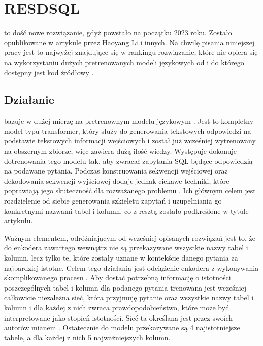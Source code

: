 \section{RESDSQL}
 to dość nowe rozwiązanie, gdyż powstało na początku 2023 roku. Zostało opublikowane w artykule   przez Haoyang Li i innych. Na chwilę pisania niniejszej pracy jest to najwyżej znajdujące się w rankingu  rozwiązanie, które nie opiera się na wykorzystaniu dużych pretrenowanych modeli językowych od  i do którego dostępny jest kod źródłowy .

\subsection{Działanie}
 bazuje w dużej mierzę na pretrenownym modelu językowym  . Jest to kompletny model typu transformer, który służy do generowania tekstowych odpowiedzi na podstawie tekstowych informacji wejściowych i został już wcześniej wytrenowany na obszernym zbiorze, więc zawiera dużą ilość wiedzy. Występuje   dokonuje dotrenowania tego modelu tak, aby zwracał zapytania SQL będące odpowiedzią na podawane pytania. Podczas konstruowania sekwencji wejściowej oraz dekodowania sekwencji wyjściowej dodaje jednak ciekawe techniki, które poprawiają jego skuteczność dla rozważanego problemu . Ich głównym celem jest rozdzielenie od siebie generowania szkieletu zapytań i uzupełniania go konkretnymi nazwami tabel i kolumn, co z resztą zostało podkreślone w tytule artykułu.

Ważnym elementem, odróżniającym  od wcześniej opisanych rozwiązań jest to, że do enkodera zawartego wewnątrz  nie są przekazywane wszystkie nazwy tabel i kolumn, lecz tylko te, które zostały uznane w kontekście danego pytania za najbardziej istotne. Celem tego działania jest odciążenie enkodera z wykonywania skomplikowanego procesu . Aby dostać potrzebną informację o istotności poszczególnych tabel i kolumn dla podanego pytania trenowana jest wcześniej całkowicie niezależna sieć, która przyjmuję pytanie oraz wszystkie nazwy tabel i kolumn i dla każdej z nich zwraca prawdopodobieństwo, które może być interpretowane jako stopień istotności. Sieć ta określana jest przez swoich autorów mianem . Ostatecznie do modelu  przekazywane są 4 najistotniejsze tabele, a dla każdej z nich 5 najważniejszych kolumn.

